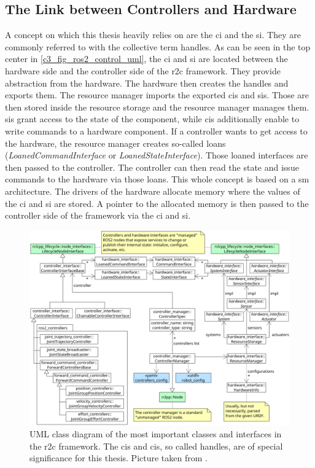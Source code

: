 \subsection{The Link between Controllers and Hardware}\label{c3_sec_link_ctrl_hw}
A concept on which this thesis heavily relies on are the \gls{ci} and the \gls{si}. They are commonly referred to with the collective term \glspl{handle}. As can be seen in the top center in \autoref{c3_fig_ros2_control_uml}, the \gls{ci} and \gls{si} are located between the hardware side and the controller side of the \gls{r2c} framework. They provide abstraction from the hardware. The hardware then creates the \glspl{handle} and exports them. The resource manager imports the exported \glspl{ci} and \glspl{si}. Those are then stored inside the resource storage and the resource manager manages them. \glspl{si} grant access to the state of the component, while \glspl{ci} additionally enable to write commands to a hardware component. If a controller wants to get access to the hardware, the resource manager creates so-called loans (\textit{LoanedCommandInterface} or \textit{LoanedStateInterface}). Those loaned interfaces are then passed to the controller. The controller can then read the state and issue commands to the hardware via those loans.\newline
This whole concept is based on a \gls{sm} architecture. The drivers of the hardware allocate memory where the values of the \gls{ci} and \gls{si} are stored. A pointer to the allocated memory is then passed to the controller side of the framework via the \gls{ci} and \gls{si}. 
\begin{figure}[htbp]
	\centering
	\includegraphics[width=1\textwidth]{Figures/c3/ros2_control_uml.png}
	\caption{UML class diagram of the most important classes and interfaces in the \gls{r2c} framework. The \glspl{ci} and \glspl{ci}, so called \glspl{handle}, are of special significance for this thesis. Picture taken from \cite{noauthor_welcome_nodate}. }
	\label{c3_fig_ros2_control_uml}
\end{figure}
 
